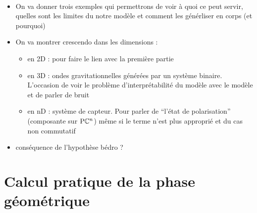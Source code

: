 
\\
\begin{itemize}
	\item On va donner trois exemples qui permettrons de voir à quoi ce peut servir, quelles sont les limites du notre modèle et comment les générliser en corps (et pourquoi)
	
	\item On va montrer crescendo dans les dimensions :\begin{itemize}
		
		\item en 2D  : pour faire le lien avec la première partie
		
		\item en 3D : ondes gravitationnelles générées par un système binaire. L'occasion de voir le problème d'interprétabilité du modèle avec le modèle et de parler de bruit
		
		\item en nD : système de capteur. Pour parler de ``l'état de polarisation'' (composante sur $\text{\normalfont P}\mathbb{C}^{n}$) même si le terme n'est plus approprié et du cas non commutatif
	\end{itemize}
	
	\item conséquence de l'hypothèse bédro ?
\end{itemize}




\section{\todo Calcul pratique de la phase géométrique}

